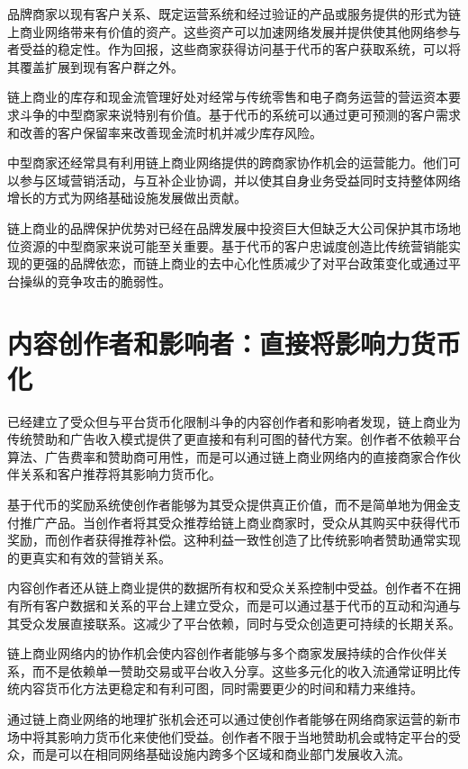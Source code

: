 \documentclass[
  Letterpaper,
]{scrbook}
\begin{document}
品牌商家以现有客户关系、既定运营系统和经过验证的产品或服务提供的形式为链上商业网络带来有价值的资产。这些资产可以加速网络发展并提供使其他网络参与者受益的稳定性。作为回报，这些商家获得访问基于代币的客户获取系统，可以将其覆盖扩展到现有客户群之外。

链上商业的库存和现金流管理好处对经常与传统零售和电子商务运营的营运资本要求斗争的中型商家来说特别有价值。基于代币的系统可以通过更可预测的客户需求和改善的客户保留率来改善现金流时机并减少库存风险。

中型商家还经常具有利用链上商业网络提供的跨商家协作机会的运营能力。他们可以参与区域营销活动，与互补企业协调，并以使其自身业务受益同时支持整体网络增长的方式为网络基础设施发展做出贡献。

链上商业的品牌保护优势对已经在品牌发展中投资巨大但缺乏大公司保护其市场地位资源的中型商家来说可能至关重要。基于代币的客户忠诚度创造比传统营销能实现的更强的品牌依恋，而链上商业的去中心化性质减少了对平台政策变化或通过平台操纵的竞争攻击的脆弱性。

\section{内容创作者和影响者：直接将影响力货币化}\label{ux5185ux5bb9ux521bux4f5cux8005ux548cux5f71ux54cdux8005ux76f4ux63a5ux5c06ux5f71ux54cdux529bux8d27ux5e01ux5316}

已经建立了受众但与平台货币化限制斗争的内容创作者和影响者发现，链上商业为传统赞助和广告收入模式提供了更直接和有利可图的替代方案。创作者不依赖平台算法、广告费率和赞助商可用性，而是可以通过链上商业网络内的直接商家合作伙伴关系和客户推荐将其影响力货币化。

基于代币的奖励系统使创作者能够为其受众提供真正价值，而不是简单地为佣金支付推广产品。当创作者将其受众推荐给链上商业商家时，受众从其购买中获得代币奖励，而创作者获得推荐补偿。这种利益一致性创造了比传统影响者赞助通常实现的更真实和有效的营销关系。

内容创作者还从链上商业提供的数据所有权和受众关系控制中受益。创作者不在拥有所有客户数据和关系的平台上建立受众，而是可以通过基于代币的互动和沟通与其受众发展直接联系。这减少了平台依赖，同时与受众创造更可持续的长期关系。

链上商业网络内的协作机会使内容创作者能够与多个商家发展持续的合作伙伴关系，而不是依赖单一赞助交易或平台收入分享。这些多元化的收入流通常证明比传统内容货币化方法更稳定和有利可图，同时需要更少的时间和精力来维持。

通过链上商业网络的地理扩张机会还可以通过使创作者能够在网络商家运营的新市场中将其影响力货币化来使他们受益。创作者不限于当地赞助机会或特定平台的受众，而是可以在相同网络基础设施内跨多个区域和商业部门发展收入流。
\end{document}
